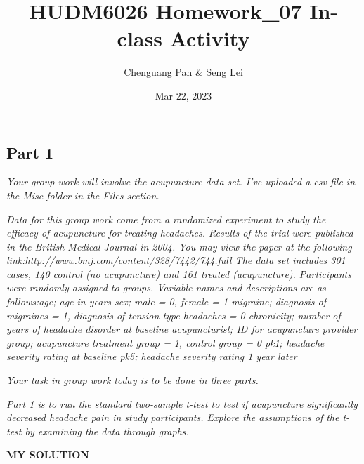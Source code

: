 \documentclass[
]{article}
\title{HUDM6026 Homework\_07 In-class Activity}
\author{Chenguang Pan \& Seng Lei}
\date{Mar 22, 2023}
\begin{document}
\maketitle

\hypertarget{part-1}{%
\subsection{Part 1}\label{part-1}}

\emph{Your group work will involve the acupuncture data set. I've
uploaded a csv file in the Misc folder in the Files section.}

\emph{Data for this group work come from a randomized experiment to
study the efficacy of acupuncture for treating headaches. Results of the
trial were published in the British Medical Journal in 2004. You may
view the paper at the following
link:\url{http://www.bmj.com/content/328/7442/744.full} The data set
includes 301 cases, 140 control (no acupuncture) and 161 treated
(acupuncture). Participants were randomly assigned to groups. Variable
names and descriptions are as follows:age; age in years sex; male = 0,
female = 1 migraine; diagnosis of migraines = 1, diagnosis of
tension-type headaches = 0 chronicity; number of years of headache
disorder at baseline acupuncturist; ID for acupuncture provider group;
acupuncture treatment group = 1, control group = 0 pk1; headache
severity rating at baseline pk5; headache severity rating 1 year later}

\emph{Your task in group work today is to be done in three parts.}

\emph{Part 1 is to run the standard two-sample t-test to test if
acupuncture significantly decreased headache pain in study participants.
Explore the assumptions of the t-test by examining the data through
graphs.}

\textbf{MY SOLUTION}
\end{document}
